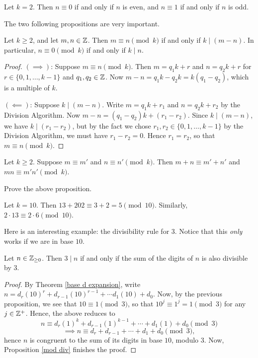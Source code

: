 \documentclass{article}
\begin{document}
\begin{example}
Let $k=2$. Then $n\equiv 0$ if and only if $n$ is even, and $n\equiv 1$ if and only if $n$ is odd.
\end{example}

The two following propositions are very important.
\begin{proposition}\label{mod div}
Let $k\geq 2$, and let $m,n\in\mathbb Z$. Then $m\equiv n\pmod k$ if and only if $k\mid(m-n)$. In particular, $n\equiv 0\pmod k$ if and only if $k\mid n$.
\end{proposition}
\begin{proof}
$(\implies)$: Suppose $m\equiv n\pmod k$. Then $m = q_1k+r$ and $n = q_2k + r$ for $r\in\{0, 1, \ldots, k-1\}$ and $q_1,q_2\in \mathbb Z$. Now $m-n = q_1k - q_2k = k(q_1 - q_2)$, which is a multiple of $k$.

$(\impliedby)$: Suppose $k\mid (m-n)$. Write $m = q_1k + r_1$ and $n = q_2k + r_2$ by the Division Algorithm. Now $m-n = (q_1 - q_2)k + (r_1 - r_2)$. Since $k\mid (m-n)$, we have $k \mid (r_1 - r_2)$, but by the fact we chose $r_1, r_2 \in \{0, 1, \ldots, k-1\}$ by the Division Algorithm, we must have $r_1 - r_2 = 0$. Hence $r_1 = r_2$, so that $m\equiv n\pmod k$.  
\end{proof}

\newpage
\begin{proposition}
Let $k\geq 2$. Suppose $m\equiv m'$ and $n\equiv n' \pmod k$. Then $m+n \equiv m' + n'$ and $mn \equiv m'n' \pmod k$.
\end{proposition}
\begin{exercise}
Prove the above proposition.
\end{exercise}
\begin{example}
Let $k=10$. Then $13 + 202 \equiv 3+2 = 5 \pmod{10}$. Similarly, $2\cdot 13 \equiv 2\cdot 6 \pmod{10}$.
\end{example}

Here is an interesting example: the divisibility rule for $3$. Notice that this \textit{only} works if we are in base $10$.
\begin{proposition}
Let $n\in\mathbb Z_{\geq 0}$. Then $3\mid n$ if and only if the sum of the digits of $n$ is also divisible by $3$.
\end{proposition}
\begin{proof}
By Theorem \ref{base d expansion}, write $n = d_r(10)^r + d_{r-1}(10)^{r-1} + \cdots d_1(10) + d_0$. Now, by the previous proposition, we see that $10 \equiv 1 \pmod 3$, so that $10^j \equiv 1^j = 1\pmod 3$ for any $j\in\mathbb Z^+$. Hence, the above reduces to
$$n \equiv d_r(1)^k + d_{r-1}(1)^{k-1} + \cdots + d_1(1) + d_0 \pmod 3$$
$$\implies n\equiv d_r + d_{r-1} + \cdots + d_1 + d_0 \pmod 3,$$
hence $n$ is congruent to the sum of its digits in base $10$, modulo $3$. Now, Proposition \ref{mod div} finishes the proof.
\end{proof}
\end{document}
